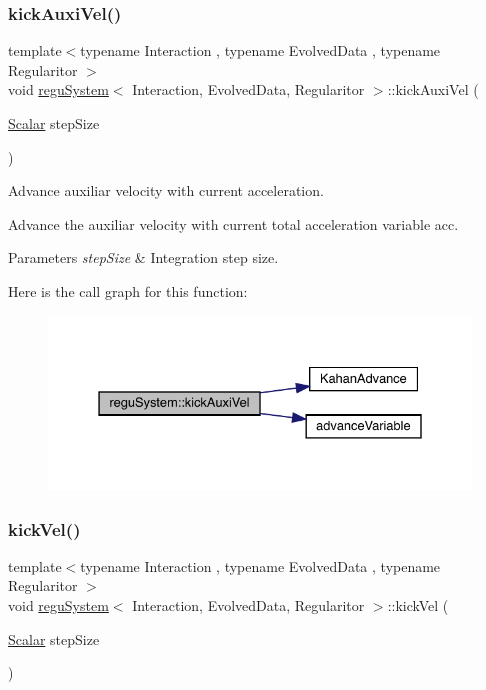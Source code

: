 \subsubsection{\texorpdfstring{kick\+Auxi\+Vel()}{kickAuxiVel()}}
{\footnotesize\ttfamily template$<$typename Interaction , typename Evolved\+Data , typename Regularitor $>$ \\
void \mbox{\hyperlink{classregu_system}{regu\+System}}$<$ Interaction, Evolved\+Data, Regularitor $>$\+::kick\+Auxi\+Vel (\begin{DoxyParamCaption}\item[{\mbox{\hyperlink{classregu_system_aca8ee2c387943164ee3ea68370fc3ac0}{Scalar}}}]{step\+Size }\end{DoxyParamCaption})\hspace{0.3cm}{\ttfamily [private]}}



Advance auxiliar velocity with current acceleration. 

Advance the auxiliar velocity with current total acceleration variable \textquotesingle{}acc\textquotesingle{}. 
\begin{DoxyParams}{Parameters}
{\em step\+Size} & Integration step size. \\
\hline
\end{DoxyParams}
Here is the call graph for this function\+:
\nopagebreak
\begin{figure}[H]
\begin{center}
\leavevmode
\includegraphics[width=331pt]{classregu_system_a53e1d725a1df2b65029f622a17364b1e_cgraph}
\end{center}
\end{figure}
\mbox{\label{classregu_system_a16cf42c1efb79a8ed5f9fecad7ad13dc}} 
\subsubsection{\texorpdfstring{kick\+Vel()}{kickVel()}}
{\footnotesize\ttfamily template$<$typename Interaction , typename Evolved\+Data , typename Regularitor $>$ \\
void \mbox{\hyperlink{classregu_system}{regu\+System}}$<$ Interaction, Evolved\+Data, Regularitor $>$\+::kick\+Vel (\begin{DoxyParamCaption}\item[{\mbox{\hyperlink{classregu_system_aca8ee2c387943164ee3ea68370fc3ac0}{Scalar}}}]{step\+Size }\end{DoxyParamCaption})\hspace{0.3cm}{\ttfamily [private]}}



